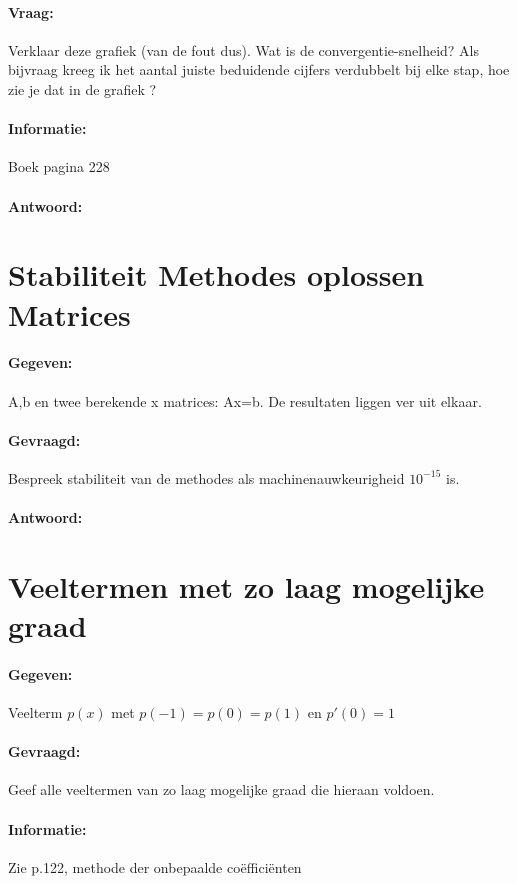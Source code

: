 \documentclass[12pt]{article}
\begin{document}
\paragraph{Vraag:}  Verklaar deze grafiek (van de fout dus). Wat is de convergentie-snelheid? Als bijvraag kreeg ik het aantal juiste beduidende cijfers verdubbelt bij elke stap, hoe zie je dat in de grafiek ?

\paragraph{Informatie:} Boek pagina 228
\paragraph{Antwoord:}

\newpage

\section{Stabiliteit Methodes oplossen Matrices}
\paragraph{Gegeven:} A,b en twee berekende x matrices: Ax=b. De resultaten liggen ver uit elkaar.
\paragraph{Gevraagd:} Bespreek stabiliteit van de methodes als machinenauwkeurigheid $10^{-15}$ is.
\paragraph{Antwoord:}

\newpage

\section{Veeltermen met zo laag mogelijke graad}
\paragraph{Gegeven:} Veelterm $p(x)$ met $p( - 1) = p(0) = p(1)$ en $p'(0) = 1$
\paragraph{Gevraagd:} Geef alle veeltermen van zo laag mogelijke graad die hieraan voldoen.
\paragraph{Informatie:} Zie p.122, methode der onbepaalde coëfficiënten
\end{document}
